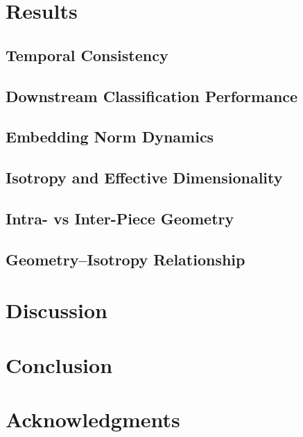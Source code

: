\documentclass[10pt,twocolumn]{article}
\begin{document}
\section{Results}

\subsection{Temporal Consistency}

\subsection{Downstream Classification Performance}

\subsection{Embedding Norm Dynamics}

\subsection{Isotropy and Effective Dimensionality}

\subsection{Intra- vs Inter-Piece Geometry}

\subsection{Geometry--Isotropy Relationship}

\section{Discussion}

\section{Conclusion}

\section*{Acknowledgments}



\end{document}
